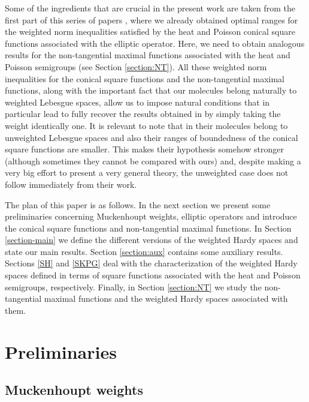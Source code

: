 \documentclass[11pt, a4paper,leqno]{amsart}
\theoremstyle{plain}
\theoremstyle{definition}
\theoremstyle{remark}
\numberwithin{equation}{section}
\begin{document}
Some of the ingredients that are crucial in the present work are taken from the first part of this series of papers \cite{MartellPrisuelos}, where we already obtained optimal ranges for the weighted norm inequalities satisfied by the heat and Poisson conical square functions associated with the elliptic operator. Here, we need to obtain analogous results for the non-tangential maximal functions  associated with the heat and Poisson semigroups (see Section \ref{section:NT}). All these weighted norm inequalities for the conical square  functions and the non-tangential maximal functions, along with the important fact that our molecules belong naturally to weighted Lebesgue spaces, allow us to impose natural conditions that in particular lead to fully recover the results obtained in \cite{HofmannMayboroda} by simply taking the weight identically one. It is relevant to note that in \cite{BuiCaoKyYangYang, BuiCaoKyYangYang:II} their molecules belong to unweighted Lebesgue spaces and also their ranges of boundedness of the conical square functions are smaller. This makes their hypothesis somehow stronger (although sometimes they cannot be compared with ours) and, despite making a very big effort to present a very general theory, the unweighted case does not follow immediately from their work. 


The plan of this paper is as follows. In the next section we present some preliminaries concerning Muckenhoupt weights, elliptic operators and introduce the conical square functions and non-tangential maximal functions. In Section \ref{section-main} we define the different versions of the weighted Hardy spaces and state our main results. Section \ref{section:aux} contains some auxiliary results. Sections \ref{SH} and \ref{SKPG} deal with the characterization of the weighted Hardy spaces defined in terms of square functions associated with the heat and Poisson semigroups, respectively. Finally, in Section \ref{section:NT} we study the non-tangential maximal functions and the weighted Hardy spaces associated with them. 

%
\section{Preliminaries}
%
%
\subsection{Muckenhoupt weights}
%
\end{document}
